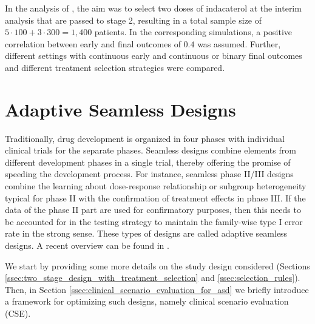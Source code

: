 \documentclass[bimj,fleqn]{w-art}
\theoremstyle{plain}
\theoremstyle{definition}
\begin{document}
In the analysis of \citet{friede_adaptive_2020}, the aim was to select two doses of indacaterol at the interim analysis that are passed to stage 2, resulting in a total sample size of $5 \cdot 100 + 3 \cdot 300 = 1,400$ patients. 
In the corresponding simulations, a positive correlation between early and final outcomes of $0.4$ was assumed.
Further, different settings with continuous early and continuous or binary final outcomes and different treatment selection strategies were compared.





\section{Adaptive Seamless Designs}
\label{sec:adaptive_seamless_designs}

Traditionally, drug development is organized in four phases with individual clinical trials for the separate phases. Seamless designs combine elements from different development phases in a single trial, thereby offering the promise of speeding the development process. For instance, seamless phase II/III designs combine the learning about dose-response relationship or subgroup heterogeneity typical for phase II with the confirmation of treatment effects in phase III. If the data of the phase II part are used for confirmatory purposes, then this needs to be accounted for in the testing strategy to maintain the family-wise type I error rate in the strong sense. These types of designs are called adaptive seamless designs. A recent overview can be found in \citet{friede_adaptive_2020}.

We start by providing some more details on the study design considered (Sections \ref{ssec:two_stage_design_with_treatment_selection} and \ref{ssec:selection_rules}). Then, in Section \ref{ssec:clinical_scenario_evaluation_for_asd} we briefly introduce a framework for optimizing such designs, namely clinical scenario evaluation (CSE). %
\end{document}

